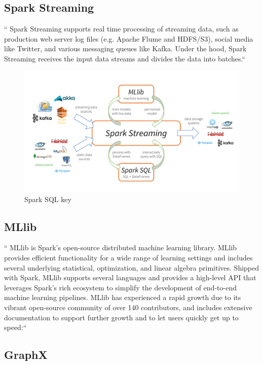 \subsection{Spark Streaming}

`` Spark Streaming supports real time processing of streaming data, such as production web server
log files (e.g. Apache Flume and HDFS/S3), social media like Twitter, and various messaging queues
like Kafka. Under the hood, Spark Streaming receives the input data streams and
divides the data into batches.``~\cite{hid-sp18-522-topal}


\begin{figure}[!ht]
  \centering\includegraphics[width=\columnwidth]{images/sparkstream.png} \caption{Spark
  SQL
  key~\cite{hid-sp18-522-sparkstream-image} }\label{f:fig4}
\end{figure}

\subsection{MLlib}


`` MLlib is Spark's open-source distributed machine learning library. MLlib provides efficient
functionality for a wide range of learning settings and includes several underlying statistical,
optimization, and linear algebra primitives. Shipped with Spark, MLlib supports several languages
and provides a high-level API that leverages Spark's rich ecosystem to simplify the development of
end-to-end machine learning pipelines. MLlib has experienced a rapid growth due to its vibrant
open-source community of over 140 contributors, and includes extensive documentation to support
further growth and to let users quickly get up to speed:``~\cite{hid-sp18-522-spark}


\subsection{GraphX}


